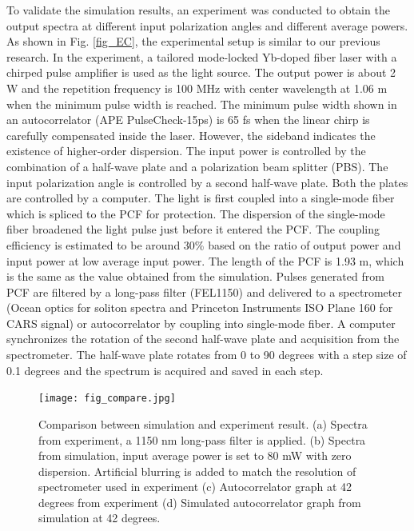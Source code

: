 \documentclass{osa-article}
\begin{document}
To validate the simulation results, an experiment was conducted to obtain the output spectra at different input polarization angles and different average powers. As shown in Fig. \ref{fig_EC}, the experimental setup is similar to our previous research\cite{chen_dual-soliton_2016}. In the experiment, a tailored mode-locked Yb-doped fiber laser with a chirped pulse amplifier is used as the light source. The output power is about 2 W and the repetition frequency is 100 MHz with center wavelength at 1.06 \textmu m when the minimum pulse width is reached. The minimum pulse width shown in an autocorrelator (APE PulseCheck-15ps) is 65 fs when the linear chirp is carefully compensated inside the laser. However, the sideband indicates the existence of higher-order dispersion. The input power is controlled by the combination of a half-wave plate and a polarization beam splitter (PBS). The input polarization angle is controlled by a second half-wave plate. Both the plates are controlled by a computer. The light is first coupled into a single-mode fiber which is spliced to the PCF for protection. The dispersion of the single-mode fiber broadened the light pulse just before it entered the PCF. The coupling efficiency is estimated to be around 30\% based on the ratio of output power and input power at low average input power. The length of the PCF is 1.93 m, which is the same as the value obtained from the simulation. Pulses generated from PCF are filtered by a long-pass filter (FEL1150) and delivered to a spectrometer (Ocean optics for soliton spectra and Princeton Instruments ISO Plane 160 for CARS signal) or autocorrelator by coupling into single-mode fiber. A computer synchronizes the rotation of the second half-wave plate and acquisition from the spectrometer. The half-wave plate rotates from 0 to 90 degrees with a step size of 0.1 degrees and the spectrum is acquired and saved in each step.

\begin{figure}[htbp]
\centering%
\texttt{[image: fig\_compare.jpg]}
\caption{Comparison between simulation and experiment result. (a) Spectra from experiment, a 1150 nm long-pass filter is applied. (b) Spectra from simulation, input average power is set to 80 mW with zero dispersion. Artificial blurring is added to match the resolution of spectrometer used in experiment (c) Autocorrelator graph at 42 degrees from experiment (d) Simulated autocorrelator graph from simulation at 42 degrees.}
\label{fig_cmp}\vspace*{-6pt}
\end{figure}
\end{document}
